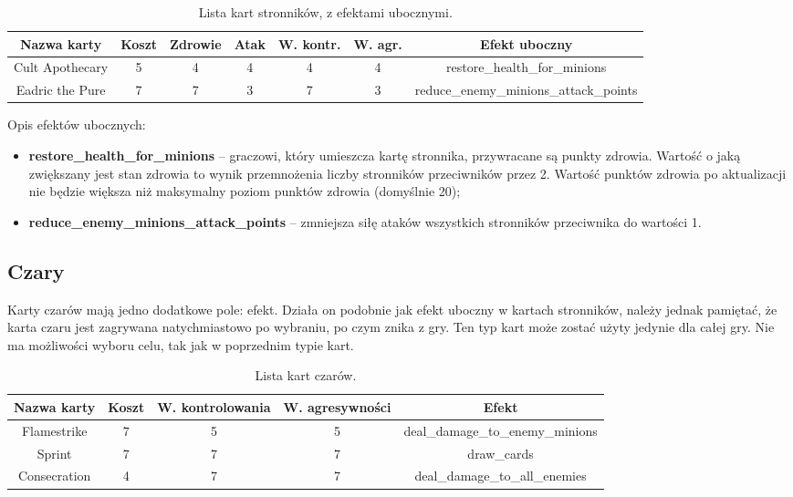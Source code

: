 \begin{table}[H]
	\centering
	\begin{tabular}{|c|c|c|c|c|c|c|}
		\hline
		\textbf{Nazwa karty} & \textbf{Koszt} & \textbf{Zdrowie} & \textbf{Atak} & \textbf{W. kontr.} & \textbf{W. agr.} & \textbf{Efekt uboczny} \\
		\hline
		Cult Apothecary & 5 & 4 & 4 & 4 & 4 & restore\_health\_for\_minions \\
		\hline
		Eadric the Pure & 7 & 7 & 3 & 7 & 3 & reduce\_enemy\_minions\_attack\_points \\
		\hline
	\end{tabular}
	\caption{Lista kart stronników, z efektami ubocznymi.}
\end{table}

Opis efektów ubocznych:

\begin{itemize}
	\item \textbf{restore\_health\_for\_minions} -- graczowi, który umieszcza kartę stronnika, przywracane są punkty zdrowia. Wartość o jaką zwiększany jest stan zdrowia to wynik przemnożenia liczby stronników przeciwników przez 2. Wartość punktów zdrowia po aktualizacji nie będzie większa niż maksymalny poziom punktów zdrowia (domyślnie 20);
	\item \textbf{reduce\_enemy\_minions\_attack\_points} -- zmniejsza siłę ataków wszystkich stronników przeciwnika do wartości 1.
\end{itemize}

\subsection{Czary}

Karty czarów mają jedno dodatkowe pole: efekt. Działa on podobnie jak efekt uboczny w kartach stronników, należy jednak pamiętać, że karta czaru jest zagrywana natychmiastowo po wybraniu, po czym znika z gry. Ten typ kart może zostać użyty jedynie dla całej gry. Nie ma możliwości wyboru celu, tak jak w poprzednim typie kart.

\begin{table}[H]
	\centering
	\begin{tabular}{|c|c|c|c|c|}
		\hline
		\textbf{Nazwa karty} & \textbf{Koszt} & \textbf{W. kontrolowania} & \textbf{W. agresywności} & \textbf{Efekt} \\
		\hline
		Flamestrike & 7 & 5 & 5 & deal\_damage\_to\_enemy\_minions \\
		\hline
		Sprint & 7 & 7 & 7 & draw\_cards \\
		\hline
		Consecration & 4 & 7 & 7 & deal\_damage\_to\_all\_enemies \\
		\hline
	\end{tabular}
		\caption{Lista kart czarów.}
\end{table}

